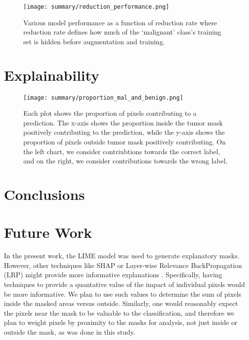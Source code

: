 \documentclass[sn-mathphys,Numbered]{sn-jnl}%
\theoremstyle{thmstyleone}%
\theoremstyle{thmstyletwo}%
\theoremstyle{thmstylethree}%
\begin{document}
\begin{figure}[!htbp]
    \centering

    \texttt{[image: summary/reduction\_performance.png]}

    \caption{Various model performance as a function of reduction rate where reduction rate defines how much of the `malignant' class's training set is hidden before augmentation and training.}
    \label{fig:reduction_performance}
\end{figure}


\section{Explainability}\label{sec_explain}


\begin{figure}[!htbp]
    \centering

    \texttt{[image: summary/proportion\_mal\_and\_benign.png]}

    \caption{Each plot shows the proportion of pixels contributing to a prediction.  The x-axis shows the proportion inside the tumor mask positively contributing to the prediction, while the y-axis shows the proportion of pixels outside tumor mask positively contributing.  On the left chart, we consider contriubtions towards the correct label, and on the right, we consider contributions towards the wrong label.}
    \label{fig:proportion}
\end{figure}


\section{Conclusions}\label{sec_conclusion}

\section{Future Work}\label{sec_future}

In the present work, the LIME model was used to generate explanatory masks.  However, other techniques like SHAP or Layer-wise Relevance BackPropagation (LRP) might provide more informative explanations \cite{SALEEM2022165}.  Specifically, having techniques to provide a quantative value of the impact of individual pixels would be more informative.  We plan to use such values to determine the sum of pixels inside the masked areas versus outside.  Similarly, one would reasonably expect the pixels near the mask to be valuable to the classification, and therefore we plan to weight pixels by proximity to the masks for analysis, not just inside or outside the mask, as was done in this study.
\end{document}
